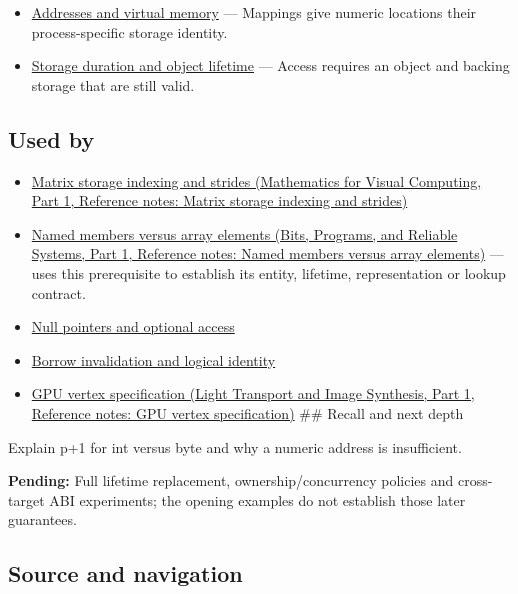 \begin{itemize}
\tightlist
\item
  \hyperref[appendix-18ee4f913c3c]{Addresses and virtual memory} --- Mappings give numeric locations their process-specific storage identity.
\item
  \hyperref[appendix-0b104bcba06b]{Storage duration and object lifetime} --- Access requires an object and backing storage that are still valid.
\end{itemize}

\subsection{Used by}\label{appendix-6af5921bc853-used-by}

\hypertarget{appendix-6af5921bc853-used-by}{}

\begin{itemize}
\item
  \href{../02-Mathematics-for-Visual-Computing-P01/main.pdf\#appendix-ffdc1d4e5350}{Matrix storage indexing and strides (Mathematics for Visual Computing, Part 1, Reference notes: Matrix storage indexing and strides)}
\item
  \href{../01-Bits-Programs-and-Reliable-Systems-P01/main.pdf\#appendix-3f7e15effba6}{Named members versus array elements (Bits, Programs, and Reliable Systems, Part 1, Reference notes: Named members versus array elements)} --- uses this prerequisite to establish its entity, lifetime, representation or lookup contract.
\item
  \hyperref[appendix-afae48c31800]{Null pointers and optional access}
\item
  \hyperref[appendix-f9b8b9188c7f]{Borrow invalidation and logical identity}
\item
  \href{../04-Light-Transport-and-Image-Synthesis-P01/main.pdf\#appendix-749ba51a6c25}{GPU vertex specification (Light Transport and Image Synthesis, Part 1, Reference notes: GPU vertex specification)} \#\# Recall and next depth
\end{itemize}

Explain p+1 for int versus byte and why a numeric address is insufficient.

\textbf{Pending:} Full lifetime replacement, ownership/concurrency policies and cross-target ABI experiments; the opening examples do not establish those later guarantees.

\subsection{Source and navigation}\label{appendix-6af5921bc853-source-and-navigation}

